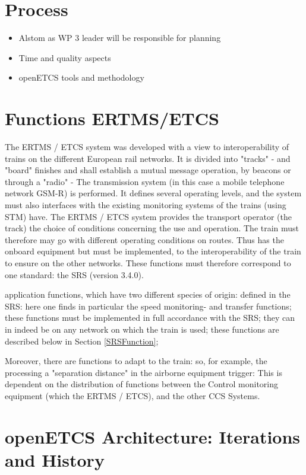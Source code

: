 \documentclass{template/openetcs_report}
\begin{document}
\section{Process}
\begin{itemize}
\item Alstom as WP 3 leader will be responsible for planning
\item Time and quality aspects
\item openETCS tools and methodology
\end{itemize}


\section{Functions ERTMS/ETCS}


The ERTMS / ETCS system was developed with a view to interoperability of trains on the 
different European rail networks. It is divided into "tracks" - and "board" finishes 
and shall establish a mutual message operation, by beacons or through a "radio" - 
The transmission system (in this case a mobile telephone network GSM-R) is performed. 
It defines several operating levels, and the system must also interfaces with the 
existing monitoring systems of the trains (using STM) have. 
The ERTMS / ETCS system provides the transport operator (the track) the choice of conditions 
concerning the use and operation. 
The train must therefore may go with different operating conditions on routes. 
Thus has the onboard equipment but must be implemented, 
to the interoperability of the train to ensure on the other networks. 
These functions must therefore correspond to one standard: the SRS (version 3.4.0). 

application functions, which have two different species of origin: 
defined in the SRS: here one finds in particular the 
speed monitoring- and transfer functions; these functions 
must be implemented in full accordance with the SRS; they can in 
indeed be on any network on which the train is used; these functions 
are described below in Section \ref{SRSFunction}; 


Moreover, there are functions to adapt to the train: so, for example, the processing 
a "separation distance" in the airborne equipment trigger: 
This is dependent on the distribution of functions between the 
Control monitoring equipment (which the ERTMS / ETCS), and the other 
CCS Systems.

\section{openETCS Architecture: Iterations and History}
\end{document}
